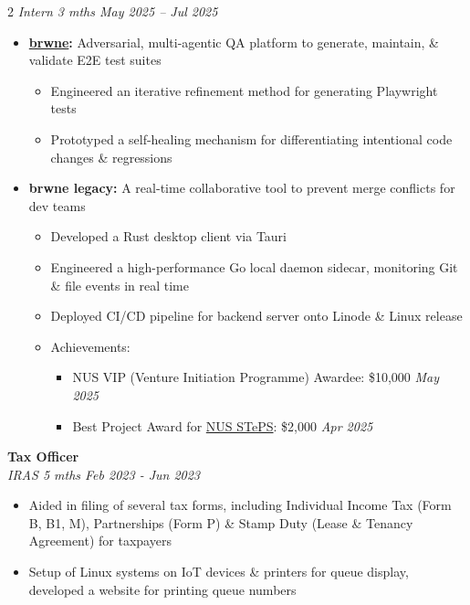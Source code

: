 \documentclass[a4paper,11pt]{article}
\newcommand{\entryHeader}[2]{\noindent\textbf{#1} \\ \textit{#2}}
\newcommand{\roleEntry}[1]{\noindent\textit{#1}}
\begin{document}
\begin{multicols}{2}
\roleEntry{\textup{Intern} \hfill 3 mths \textbar{} May 2025 -- Jul 2025}
\begin{itemize}
    \item \textbf{\href{https://www.brwne.dev}{brwne}:} Adversarial, multi-agentic QA platform to generate, maintain, \& validate E2E test suites
    \begin{itemize}
        \item Engineered an iterative refinement method for generating Playwright tests
        \item Prototyped a self-healing mechanism for differentiating intentional code changes \& regressions
    \end{itemize}
    \item \textbf{brwne legacy:} A real-time collaborative tool to prevent merge conflicts for dev teams
    \begin{itemize}
        \item Developed a Rust desktop client via Tauri
        \item Engineered a high-performance Go local daemon sidecar, monitoring Git \& file events in real time
        \item Deployed CI/CD pipeline for backend server onto Linode \& Linux release
        \item Achievements:
        \begin{itemize}
            \item NUS VIP (Venture Initiation Programme) Awardee: \$10,000  \hfill \textit{May 2025}
            \item Best Project Award for \href{https://uvents.nus.edu.sg/event/26th-steps}{NUS STePS}: \$2,000  \hfill \textit{Apr 2025}
        \end{itemize}
    \end{itemize}
\end{itemize}

\smallskip
\entryHeader{Tax Officer}{IRAS \hfill 5 mths \textbar{} Feb 2023 - Jun 2023}
\begin{itemize}
    \item Aided in filing of several tax forms, including Individual Income Tax (Form B, B1, M), Partnerships (Form P) \& Stamp Duty (Lease \& Tenancy Agreement) for taxpayers
    \item Setup of Linux systems on IoT devices \& printers for queue display, developed a website for printing queue numbers
\end{itemize}


\end{multicols}
\end{document}
